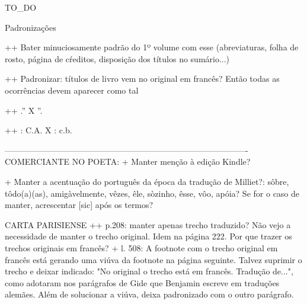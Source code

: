 TO_DO

Padronizações


++ Bater minuciosamente padrão do 1º volume com esse (abreviaturas, folha de rosto, página de cŕeditos, disposição dos títulos no sumário...)

++ Padronizar: títulos de livro vem no original em francês? Então todas as ocorrências devem aparecer como tal

++ .'' X ''.

++ : C.A. X : c.b.

----------------------------------------------------------------------------------------
COMERCIANTE NO POETA:
+ Manter menção à edição Kindle?


+ Manter a acentuação do português da época da tradução de Milliet?: sôbre, tôdo(a)(as), amigàvelmente, vêzes, êle, sòzinho, êsse, vôo, apóia? Se for o caso de manter, acrescentar [sic] após os termos?

CARTA PARISIENSE ++ p.208: manter apenas trecho traduzido? Não vejo a necessidade de manter o trecho original. Idem na página 222. Por que trazer os trechos originais em francês? + l. 508: A footnote com o trecho original em francês está gerando uma viúva da footnote na página seguinte. Talvez suprimir o trecho e deixar indicado: "No original o trecho está em francês. Tradução de...", como adotaram nos parágrafos de Gide que Benjamin escreve em traduções alemães. Além de solucionar a viúva, deixa padronizado com o outro parágrafo.